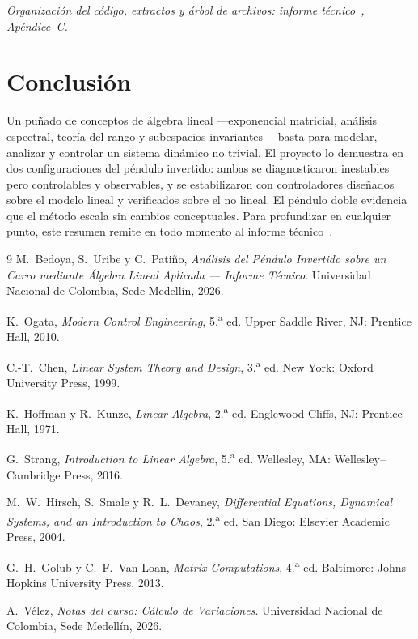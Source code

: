 \documentclass[11pt,letterpaper]{article}
\begin{document}
\noindent\emph{Organización del código, extractos y árbol de archivos:
informe técnico~\cite{tecnico}, Apéndice~C.}

\section{Conclusión}

Un puñado de conceptos de álgebra lineal ---exponencial matricial, análisis
espectral, teoría del rango y subespacios invariantes--- basta para modelar,
analizar y controlar un sistema dinámico no trivial. El proyecto lo demuestra en
dos configuraciones del péndulo invertido: ambas se diagnosticaron inestables
pero controlables y observables, y se estabilizaron con controladores diseñados
sobre el modelo lineal y verificados sobre el no lineal. El péndulo doble
evidencia que el método escala sin cambios conceptuales. Para profundizar en
cualquier punto, este resumen remite en todo momento al informe
técnico~\cite{tecnico}.

\begin{thebibliography}{9}
\small
{}
M.~Bedoya, S.~Uribe y C.~Patiño, \emph{Análisis del Péndulo Invertido sobre un
Carro mediante Álgebra Lineal Aplicada --- Informe Técnico}. Universidad Nacional
de Colombia, Sede Medellín, 2026. 

K.~Ogata, \emph{Modern Control Engineering}, 5.\textsuperscript{a} ed.
Upper Saddle River, NJ: Prentice Hall, 2010.

C.-T.~Chen, \emph{Linear System Theory and Design}, 3.\textsuperscript{a} ed.
New York: Oxford University Press, 1999.

K.~Hoffman y R.~Kunze, \emph{Linear Algebra}, 2.\textsuperscript{a} ed.
Englewood Cliffs, NJ: Prentice Hall, 1971.

G.~Strang, \emph{Introduction to Linear Algebra}, 5.\textsuperscript{a} ed.
Wellesley, MA: Wellesley--Cambridge Press, 2016.

M.~W.~Hirsch, S.~Smale y R.~L.~Devaney, \emph{Differential Equations,
Dynamical Systems, and an Introduction to Chaos}, 2.\textsuperscript{a} ed.
San Diego: Elsevier Academic Press, 2004.

G.~H.~Golub y C.~F.~Van Loan, \emph{Matrix Computations},
4.\textsuperscript{a} ed. Baltimore: Johns Hopkins University Press, 2013.

A.~Vélez, \emph{Notas del curso: Cálculo de Variaciones}. Universidad Nacional de Colombia, Sede Medellín, 2026.

\end{thebibliography}
\end{document}

